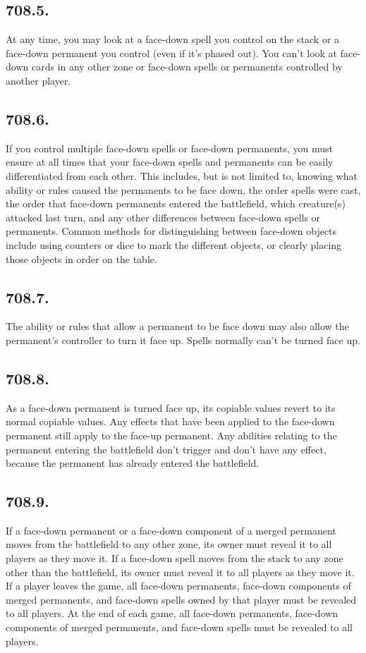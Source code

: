 \subsection*{708.5.}
At any time, you may look at a face-down spell you control on the stack or a face-down permanent you control (even if it’s phased out). You can’t look at face-down cards in any other zone or face-down spells or permanents controlled by another player.

\subsection*{708.6.}
If you control multiple face-down spells or face-down permanents, you must ensure at all times that your face-down spells and permanents can be easily differentiated from each other. This includes, but is not limited to, knowing what ability or rules caused the permanents to be face down, the order spells were cast, the order that face-down permanents entered the battlefield, which creature(s) attacked last turn, and any other differences between face-down spells or permanents. Common methods for distinguishing between face-down objects include using counters or dice to mark the different objects, or clearly placing those objects in order on the table.

\subsection*{708.7.}
The ability or rules that allow a permanent to be face down may also allow the permanent’s controller to turn it face up. Spells normally can’t be turned face up.

\subsection*{708.8.}
As a face-down permanent is turned face up, its copiable values revert to its normal copiable values. Any effects that have been applied to the face-down permanent still apply to the face-up permanent. Any abilities relating to the permanent entering the battlefield don’t trigger and don’t have any effect, because the permanent has already entered the battlefield.

\subsection*{708.9.}
If a face-down permanent or a face-down component of a merged permanent moves from the battlefield to any other zone, its owner must reveal it to all players as they move it. If a face-down spell moves from the stack to any zone other than the battlefield, its owner must reveal it to all players as they move it. If a player leaves the game, all face-down permanents, face-down components of merged permanents, and face-down spells owned by that player must be revealed to all players. At the end of each game, all face-down permanents, face-down components of merged permanents, and face-down spells must be revealed to all players.

